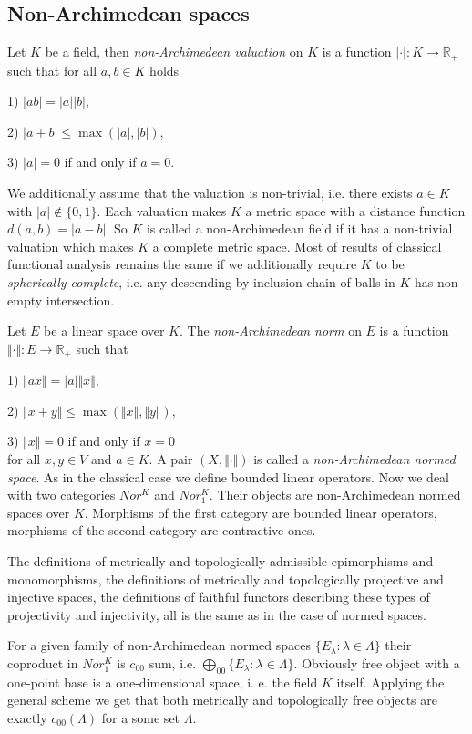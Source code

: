 \documentclass[a0b,landscape]{a0poster}
\begin{document}
\begin{multicols}{4}
\section*{Non-Archimedean spaces}

Let $K$ be a field, then \textit{non-Archimedean valuation} on $K$ is a function $|\cdot|:K\to \mathbb{R}_+$ such that for all $a,b\in K$ holds

1) $|ab|=|a||b|,$

2) $|a+b|\leq\max(|a|,|b|),$

3) $|a|=0$ if and only if $a=0.$

We additionally assume that the valuation is non-trivial, i.e. there exists $a\in K$ with $|a|\notin\{0,1\}$. Each valuation makes $K$ a metric space with a distance function 
$d(a,b)=|a-b|$. So $K$ is called a non-Archimedean field if it has a non-trivial valuation which makes $K$ a complete metric space. Most of results of classical functional 
analysis remains the same if we additionally require $K$ to be \textit{spherically complete}, i.e. any descending by inclusion chain of balls in $K$ has non-empty intersection.

Let $E$ be a linear space over $K$. The \textit{non-Archimedean norm} on $E$ is a function $\Vert\cdot\Vert:E\to\mathbb{R}_+$ such that

1) $\Vert a x\Vert=|a|\Vert x\Vert,$

2) $\Vert x+y\Vert\leq\max(\Vert x\Vert,\Vert y\Vert),$

3) $\Vert x\Vert=0$ if and only if $x=0$
\\
for all $x,y\in V$ and $a\in K$. A pair $(X,\Vert\cdot\Vert)$ is called a \textit{non-Archimedean normed space}. As in the classical case we define bounded linear operators. Now we 
deal with two categories $Nor^K$ and $Nor^K_1$. Their objects are non-Archimedean normed spaces over $K$. Morphisms of the first category are bounded linear operators, 
morphisms of the second category are contractive ones.

The definitions of metrically and topologically admissible epimorphisms and monomorphisms, the definitions of metrically and topologically projective and injective spaces, the 
definitions of faithful functors describing these types of projectivity and injectivity, all is the same as in the case of normed spaces.

For a given family of non-Archimedean normed spaces $\{E_ \lambda : \lambda \in \Lambda\}$ their coproduct in $Nor_1^K$ is $c_{00}$ sum, i.e.
$\bigoplus_{00}\{E_ \lambda : \lambda \in \Lambda\}$.
Obviously free object with a one-point base is a one-dimensional space, i. e. the field $K$ itself. Applying the general scheme we get that both metrically and topologically 
free objects are exactly $c_{00}(\Lambda)$ for a some set $\Lambda$.



\end{multicols}
\end{document}
